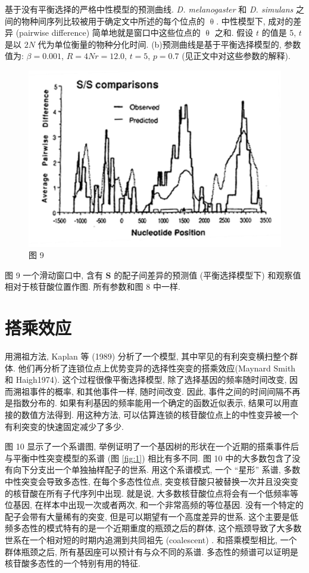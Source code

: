 \documentclass[12pt]{article}
\begin{document}
基于没有平衡选择的严格中性模型的预测曲线. \textit{D. melanogaster} 和 \textit{D. simulans}
之间的物种间序列比较被用于确定文中所述的每个位点的 $\uptheta$. 中性模型下, 成对的差异 (pairwise difference)
简单地就是窗口中这些位点的 $\uptheta$ 之和. 假设 $t$ 的值是 5, $t$ 是以 $2N$ 代为单位衡量的物种分化时间.
(b)预测曲线是基于平衡选择模型的, 参数值为: $\beta = 0.001$, $R = 4Nr = 12.0$, $t=5$, $p=0.7$
(见正文中对这些参数的解释).

\begin{figure}
    \centering
    \includegraphics{coalescent-process.images/image9.png}
    \caption{图 9}
\end{figure}

图 9 一个滑动窗口中, 含有 \textbf{S} 的配子间差异的预测值 (平衡选择模型下) 和观察值相对于核苷酸位置作图. 所有参数和图
8 中一样.

\section{搭乘效应}

用溯祖方法, Kaplan 等 (1989) 分析了一个模型, 其中罕见的有利突变横扫整个群体.
他们再分析了连锁位点上优势变异的选择性突变的搭乘效应(Maynard Smith 和 Haigh1974). 这个过程很像平衡选择模型,
除了选择基因的频率随时间改变, 因而溯祖事件的概率, 和其他事件一样, 随时间改变. 因此, 事件之间的时间间隔不再是指数分布的.
如果有利基因的频率能用一个确定的函数近似表示, 结果可以用直接的数值方法得到. 用这种方法,
可以估算连锁的核苷酸位点上的中性变异被一个有利突变的快速固定减少了多少.

图 10 显示了一个系谱图, 举例证明了一个基因树的形状在一个近期的搭乘事件后与平衡中性突变模型的系谱 (图
\ref{fig:1}) 相比有多不同. 图 10 中的大多数包含了没有向下分支出一个单独抽样配子的世系. 用这个系谱模式,
一个 ``星形'' 系谱, 多数中性突变会导致多态性, 在每个多态性位点,
突变核苷酸只被替换一次并且没突变的核苷酸在所有子代序列中出现. 就是说, 大多数核苷酸位点将会有一个低频率等位基因,
在样本中出现一次或者两次, 和一个非常高频的等位基因. 没有一个特定的配子会带有大量稀有的突变,
但是可以期望有一个高度差异的世系. 这个主要是低频多态性的模式特有的是一个近期重度的瓶颈之后的群体,
这个瓶颈导致了大多数世系在一个相对短的时期内追溯到共同祖先 (coalescent) . 和搭乘模型相比, 一个群体瓶颈之后,
所有基因座可以预计有与众不同的系谱. 多态性的频谱可以证明是核苷酸多态性的一个特别有用的特征.
\end{document}
